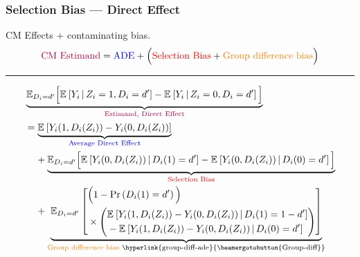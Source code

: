 \documentclass[dvipsnames]{beamer} %
\newcommand{\Prob}[1]{\Pr\left( #1 \right)}                         %
\newcommand{\E}[2][]{\mathbb{E}_{#1} \left[ #2 \right]}                    %
\newcommand{\Egiven}[3][]{\mathbb{E}_{#1} \left[ #2 \, \middle\vert \, #3 \right]} %
\begin{document}
\begin{frame}[noframenumbering]
    \frametitle{Selection Bias --- Direct Effect}
    CM Effects $+$ contaminating bias.
    \[ \text{\textcolor{purple}{CM Estimand}}
        = \text{\textcolor{blue}{ADE}}
            + \Big(\text{\textcolor{red}{Selection Bias}}
            + \text{\textcolor{orange}{Group difference bias}}\Big) \]
    \hyperlink{cm-model}{}
    \vskip-0.25cm

    \par\noindent\rule{\textwidth}{0.4pt}
    {\footnotesize
    \begin{align*}
        & \underbrace{\mathbb E_{D_i=d'} \Big[
            \Egiven{Y_i}{Z_i = 1, D_i=d'} - \Egiven{Y_i}{Z_i = 0, D_i=d'} \Big]}_{
                \text{\textcolor{purple}{Estimand, Direct Effect}} } \\
        & = \underbrace{\E{Y_i(1, D_i(Z_i)) - Y_i(0, D_i(Z_i))}}_{
            \text{\textcolor{blue}{Average Direct Effect}}} \\
        & \;\;\;\; + 
        \underbrace{ \mathbb E_{D_i=d'} \Big[ 
            \Egiven{Y_i(0, D_i(Z_i))}{D_i(1) = d'} 
            - \Egiven{Y_i(0, D_i(Z_i))}{D_i(0) = d'} \Big] }_{
                \text{\textcolor{red}{Selection Bias}}} \\
        & \;\;\;\; + \underbrace{ \E[D_i =d']{
            \begin{aligned}
            &\Big(1 - \Prob{D_i(1) = d'} \Big) \\
            &\times \left( \begin{aligned}
                &\Egiven{Y_i(1, D_i(Z_i)) - Y_i(0, D_i(Z_i))}{D_i(1) = 1-d'} \\ 
                &  - \Egiven{Y_i(1, D_i(Z_i)) - Y_i(0, D_i(Z_i))}{D_i(0) = d'}
                \end{aligned} \right) \end{aligned}} }_{
                    \text{\textcolor{orange}{Group difference bias} 
                        \hyperlink{group-diff-ade}{\beamergotobutton{Group-diff}}}}
    \end{align*}}
\end{frame}
\end{document}

